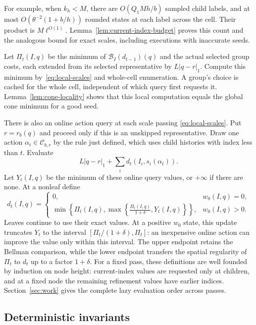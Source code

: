 For example, when $k_h<M$, there are $O(Q_1Mh/b)$ sampled child
labels, and at most $O(\theta^{-2}(1+b/h))$ rounded states at each
label across the cell. Their product is $M\ell^{O(1)}$.
Lemma~\ref{lem:current-index-budget} proves this count and the analogous
bound for exact scales, including executions with inaccurate seeds.

Let $\Pi_t(I,q)$ be the minimum of
$\mathcal B_I(d_{t-1})(q)$ and the actual selected group costs, each
extended from its selected representative by $L|q-r|_1$.  Compute this
minimum by~\eqref{eq:local-scales} and whole-cell enumeration.  A
group's choice is cached for the whole cell, independent of which
query first requests it.  Lemma~\ref{lem:cone-locality} shows that this
local computation equals the global cone minimum for a good seed.

There is also an online action query at each scale passing
\eqref{eq:local-scales}.  Put $r=r_b(q)$ and proceed only if this is
an unskipped representative.  Draw one action
$\alpha_t\in\mathcal C_{b,r}$ by the rule just defined,
which uses child histories with index less than $t$.  Evaluate
\[
 L|q-r|_1+\sum_i d_t(I_i,s_i(\alpha_t)).
\]
Let $Y_t(I,q)$ be the minimum of these online query values, or
$+\infty$ if there are none.  At a nonleaf define
\begin{equation}\label{eq:refined-update}
 d_t(I,q)=
 \begin{cases}
 0,&w_0(I,q)=0,\\[2pt]
 \displaystyle\min\left\{\Pi_t(I,q),
       \max\left\{\frac{\Pi_t(I,q)}{1+\delta},Y_t(I,q)\right\}\right\},
       &w_0(I,q)>0.
 \end{cases}
\end{equation}
Leaves continue to use their exact values. At a positive $w_0$ state,
this update truncates $Y_t$ to the interval
$[\Pi_t/(1+\delta),\Pi_t]$: an inexpensive online action can improve
the value only within this interval. The upper endpoint retains the
Bellman comparison, while the lower endpoint transfers the spatial
regularity of $\Pi_t$ to $d_t$ up to a factor $1+\delta$.
For a fixed pass, these definitions are well founded by induction on
node height: current-index values are requested only at children, and
at a fixed node the remaining refinement values have earlier indices.
Section~\ref{sec:work} gives the complete lazy evaluation order across passes.

\subsection{Deterministic invariants}

